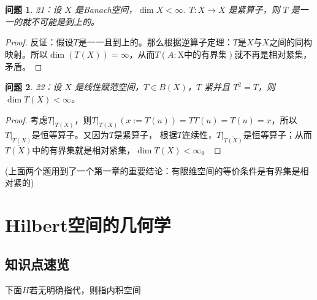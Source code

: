 \documentclass[a4paper, 12pt]{ctexart}
\newtheorem*{theorem}{问题}%
\begin{document}
\begin{theorem}
21：设 $X$ 是Banach空间，$\dim X < \infty$. $T: X \rightarrow X$ 是紧算子，则 $T$ 是一一的就不可能是到上的。
\end{theorem}

\begin{proof}
反证：假设$T$是一一且到上的。那么根据逆算子定理：$T$是$X$与$X$之间的同构映射。所以$\dim(T(X))=\infty$，从而$T(A:\text{X中的有界集})$就不再是相对紧集，矛盾。
\end{proof}

\begin{theorem}
22：设 $X$ 是线性赋范空间，$T \in B(X)$，$T$ 紧并且 $T^2 = T$，则 $\dim T(X) < \infty$。
\end{theorem}

\begin{proof}
考虑$T|_{T(X)}$，则$T|_{T(X)} (x:=T(u))=TT(u)=T(u)=x$，所以$T|_{T(X)}$是恒等算子。又因为$T$是紧算子，
根据$T$连续性，$T|_{\overline{T(X)}}$是恒等算子；从而$\overline{T(X)}$中的有界集就是相对紧集，$\dim T(X) < \infty$。
\end{proof}

(上面两个题用到了一个第一章的重要结论：有限维空间的等价条件是有界集是相对紧的)

\section{Hilbert空间的几何学}
\subsection{知识点速览}
下面$H$若无明确指代，则指内积空间
\end{document}
